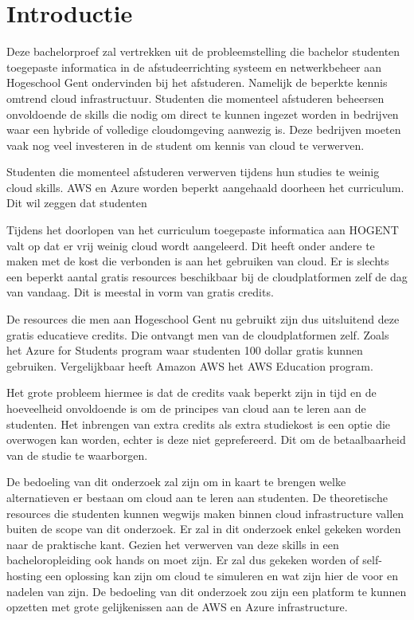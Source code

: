 
\section{Introductie}%
\label{sec:introductie}

Deze bachelorproef zal vertrekken uit de probleemstelling die bachelor studenten toegepaste informatica in de afstudeerrichting systeem en netwerkbeheer aan Hogeschool Gent ondervinden bij het afstuderen. Namelijk de beperkte kennis omtrend cloud infrastructuur. Studenten die momenteel afstuderen beheersen onvoldoende de skills die nodig om direct te kunnen ingezet worden in bedrijven waar een hybride of volledige cloudomgeving aanwezig is. Deze bedrijven moeten vaak nog veel investeren in de student om kennis van cloud te verwerven.

Studenten die momenteel afstuderen verwerven tijdens hun studies te weinig cloud skills. AWS en Azure worden beperkt aangehaald doorheen het curriculum. Dit wil zeggen dat studenten  

Tijdens het doorlopen van het curriculum toegepaste informatica aan HOGENT valt op dat er vrij weinig cloud wordt aangeleerd. Dit heeft onder andere te maken met de kost die verbonden is aan het gebruiken van cloud. Er is slechts een beperkt aantal gratis resources beschikbaar bij de cloudplatformen zelf de dag van vandaag. Dit is meestal in vorm van gratis credits.

De resources die men aan Hogeschool Gent nu gebruikt zijn dus uitsluitend deze gratis educatieve credits. Die ontvangt men van de cloudplatformen zelf. Zoals het Azure for Students program waar studenten 100 dollar gratis kunnen gebruiken. Vergelijkbaar heeft Amazon AWS het AWS Education program. 

Het grote probleem hiermee is dat de credits vaak beperkt zijn in tijd en de hoeveelheid onvoldoende is om de principes van cloud aan te leren aan de studenten. Het inbrengen van extra credits als extra studiekost is een optie die overwogen kan worden, echter is deze niet geprefereerd. Dit om de betaalbaarheid van de studie te waarborgen.

De bedoeling van dit onderzoek zal zijn om in kaart te brengen welke alternatieven er bestaan om cloud aan te leren aan studenten. De theoretische resources die studenten kunnen wegwijs maken binnen cloud infrastructure vallen buiten de scope van dit onderzoek. Er zal in dit onderzoek enkel gekeken worden naar de praktische kant. Gezien het verwerven van deze skills in een bacheloropleiding ook hands on moet zijn. Er zal dus gekeken worden of self-hosting een oplossing kan zijn om cloud te simuleren en wat zijn hier de voor en nadelen van zijn. De bedoeling van dit onderzoek zou zijn een platform te kunnen opzetten met grote gelijkenissen aan de AWS en Azure infrastructure. 


